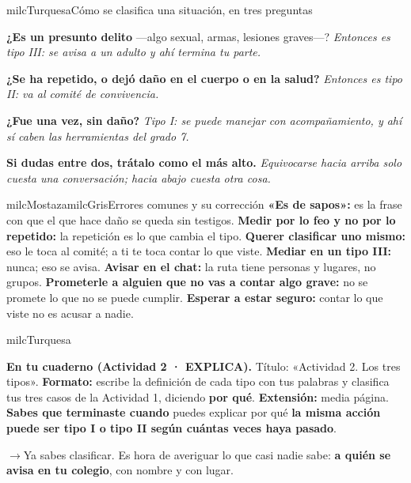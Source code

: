 \documentclass[11pt,letterpaper]{article}
\newcommand{\puente}[1]{%
  \begin{puentebox}%
    \textcolor{milcGradeDark}{$\rightarrow$}\hspace{2mm}#1%
  \end{puentebox}%
}
\begin{document}
\begin{drawbox}{milcTurquesa}{Cómo se clasifica una situación, en tres preguntas}
\begin{pasoslista}
\item \textbf{¿Es un presunto delito} ---algo sexual, armas, lesiones graves---? \emph{Entonces es tipo III: se avisa a un adulto y ahí termina tu parte.}
\item \textbf{¿Se ha repetido, o dejó daño en el cuerpo o en la salud?} \emph{Entonces es tipo II: va al comité de convivencia.}
\item \textbf{¿Fue una vez, sin daño?} \emph{Tipo I: se puede manejar con acompañamiento, y ahí sí caben las herramientas del grado 7.}
\item \textbf{Si dudas entre dos, trátalo como el más alto.} \emph{Equivocarse hacia arriba solo cuesta una conversación; hacia abajo cuesta otra cosa.}
\end{pasoslista}
\end{drawbox}

\begin{softbox}{milcMostaza}{milcGris}{Errores comunes y su corrección}
\textbf{«Es de sapos»:} es la frase con que el que hace daño se queda sin testigos. \textbf{Medir por lo feo y no por lo repetido:} la repetición es lo que cambia el tipo. \textbf{Querer clasificar uno mismo:} eso le toca al comité; a ti te toca contar lo que viste. \textbf{Mediar en un tipo III:} nunca; eso se avisa. \textbf{Avisar en el chat:} la ruta tiene personas y lugares, no grupos. \textbf{Prometerle a alguien que no vas a contar algo grave:} no se promete lo que no se puede cumplir. \textbf{Esperar a estar seguro:} contar lo que viste no es acusar a nadie.
\end{softbox}

\begin{infoband}{milcTurquesa}


\textbf{En tu cuaderno (Actividad 2 · EXPLICA).} Título: «Actividad 2. Los tres tipos». \textbf{Formato:} escribe la definición de cada tipo con tus palabras y clasifica tus tres casos de la Actividad 1, diciendo \textbf{por qué}. \textbf{Extensión:} media página. \textbf{Sabes que terminaste cuando} puedes explicar por qué \textbf{la misma acción puede ser tipo I o tipo II según cuántas veces haya pasado}.
\end{infoband}

\puente{Ya sabes clasificar. Es hora de averiguar lo que casi nadie sabe: \textbf{a quién se avisa en tu colegio}, con nombre y con lugar.}
\end{document}
